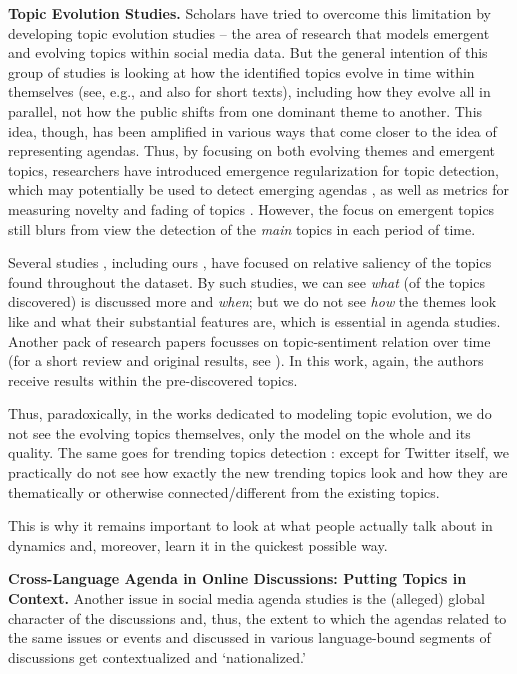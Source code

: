 \textbf{Topic Evolution Studies.} Scholars have tried to overcome this limitation by developing topic evolution studies -- the area of research that models emergent and evolving topics within social media data. But the general intention of this group of studies is looking at how the identified topics evolve in time within themselves (see, e.g., \cite{AlamRyuLee,ZhangMaoLin} and also \cite{ZhangMaoZeng} for short texts), including how they evolve all in parallel, not how the public shifts from one dominant theme to another. This idea, though, has been amplified in various ways that come closer to the idea of representing agendas. Thus, by focusing on both evolving themes and emergent topics, researchers have introduced emergence regularization for topic detection, which may potentially be used to detect emerging agendas \cite{SahaSindhwani}, as well as metrics for measuring novelty and fading of topics \cite{HuangPengWang}. However, the focus on emergent topics still blurs from view the detection of the \textit{main} topics in each period of time.

Several studies \cite{DengCaiZhang}, including ours \cite{SmoliarovaBodrunovaYakunin}, have focused on relative saliency of the topics found throughout the dataset. By such studies, we can see \textit{what} (of the topics discovered) is discussed more and \textit{when}; but we do not see \textit{how} the themes look like and what their substantial features are, which is essential in agenda studies. Another pack of research papers focusses on topic-sentiment relation over time (for a short review and original results, see \cite{DermoucheVelcinKhouas}). In this work, again, the authors receive results within the pre-discovered topics.

Thus, paradoxically, in the works dedicated to modeling topic evolution, we do not see the evolving topics themselves, only the model on the whole and its quality. The same goes for trending topics detection \cite{WangAgichteinBenzi}: except for Twitter itself, we practically do not see how exactly the new trending topics look and how they are thematically or otherwise connected/different from the existing topics.

This is why it remains important to look at what people actually talk about in dynamics and, moreover, learn it in the quickest possible way.

\textbf{Cross-Language Agenda in Online Discussions: Putting Topics in Context.} Another issue in social media agenda studies is the (alleged) global character of the discussions and, thus, the extent to which the agendas related to the same issues or events and discussed in various language-bound segments of discussions get contextualized and ‘nationalized.’

